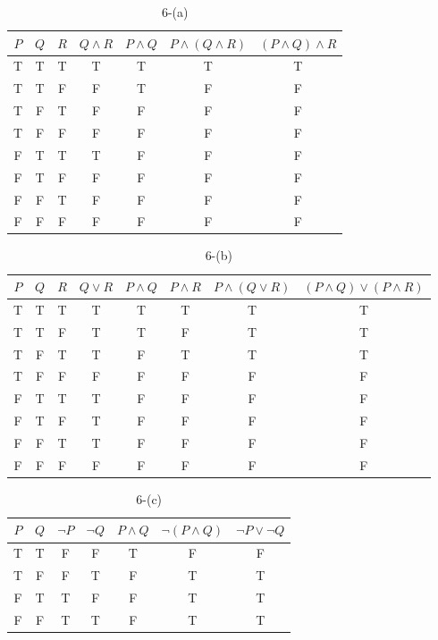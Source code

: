 \documentclass{article}
\begin{document}
	\begin{table}[!h]
	\centering
	\caption{6-(a)}
	\begin{tabular}{|c|c|c|c|c|c|c|}
	\hline
	$P$ & $Q$ & $R$ & $Q \land R$ & $P \land Q$ & $P \land (Q \land R)$ & $(P \land Q) \land R$\\ \hline
	T & T & T & T & T & T & T  \\ \hline
	T & T & F & F & T & F & F  \\ \hline
	T & F & T & F & F & F & F  \\ \hline
	T & F & F & F & F & F & F  \\ \hline
	F & T & T & T & F & F & F  \\ \hline
	F & T & F & F & F & F & F  \\ \hline
	F & F & T & F & F & F & F  \\ \hline
	F & F & F & F & F & F & F  \\ \hline
	\end{tabular}
	\end{table}

	\begin{table}[!h]
	\centering
	\caption{6-(b)}
	\begin{tabular}{|c|c|c|c|c|c|c|c|}
	\hline
	$P$ & $Q$ & $R$ & $Q \lor R$ & $P \land Q$ & $P \land R$ & $P \land (Q \lor R)$ & $(P \land Q) \lor (P \land R)$\\ \hline
	T & T & T & T & T & T & T & T  \\ \hline
	T & T & F & T & T & F & T & T  \\ \hline
	T & F & T & T & F & T & T & T  \\ \hline
	T & F & F & F & F & F & F & F  \\ \hline
	F & T & T & T & F & F & F & F  \\ \hline
	F & T & F & T & F & F & F & F  \\ \hline
	F & F & T & T & F & F & F & F  \\ \hline
	F & F & F & F & F & F & F & F  \\ \hline
	\end{tabular}
	\end{table}

	\begin{table}[!h]
	\centering
	\caption{6-(c)}
	\begin{tabular}{|c|c|c|c|c|c|c|}
	\hline
	$P$ & $Q$ & $\neg P$ & $\neg Q$ & $P \land Q$ & $\neg(P \land Q)$ & $\neg P \lor \neg Q$\\ \hline
	T & T & F & F & T & F & F \\ \hline
	T & F & F & T & F & T & T \\ \hline
	F & T & T & F & F & T & T \\ \hline
	F & F & T & T & F & T & T \\ \hline
	\end{tabular}
	\end{table}	
\end{document}
